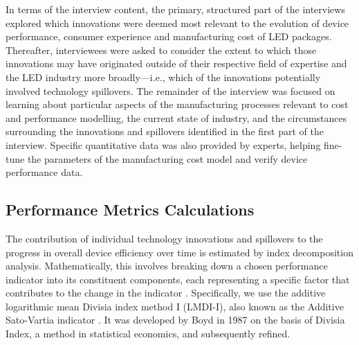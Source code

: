 \documentclass[parskip=full]{article}
\begin{document}
In terms of the interview content, the primary, structured part of the interviews explored which innovations were deemed most relevant to the evolution of device performance, consumer experience and manufacturing cost of LED packages. Thereafter, interviewees were asked to consider the extent to which those innovations may have originated outside of their respective field of expertise and the LED industry more broadly—i.e., which of the innovations potentially involved technology spillovers. The remainder of the interview was focused on learning about particular aspects of the manufacturing processes relevant to cost and performance modelling, the current state of industry, and the circumstances surrounding the innovations and spillovers identified in the first part of the interview. Specific quantitative data was also provided by experts, helping fine-tune the parameters of the manufacturing cost model and verify device performance data.

\subsection{Performance Metrics Calculations}
\label{subsec:performance_metrics}

The contribution of individual technology innovations and spillovers to the progress in overall device efficiency over time is estimated by index decomposition analysis. Mathematically, this involves breaking down a chosen performance indicator into its constituent components, each representing a specific factor that contributes to the change in the indicator \cite{Ang1997}. Specifically, we use the additive logarithmic mean Divisia index method I (LMDI-I), also known as the Additive Sato-Vartia indicator \cite{deBoer2019}. It was developed by Boyd in 1987 \cite{Boyd1987} on the basis of Divisia Index, a method in statistical economics, and subsequently refined.
\end{document}
